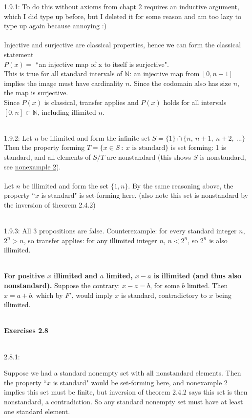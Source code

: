 \documentclass{article}
\newcommand{\hsp}[1][5]{\hspace{0.#1 cm}}
\newcommand{\hcm}[1][1]{\hspace{#1 cm}}
\newcommand{\st}{\ : \ }
\newcommand{\N}{\mathbb{N}}
\newcommand{\ch}[1]{\text{#1}}
\begin{document}
\begin{flushleft}
\hsp 1.9.1: To do this without axioms from chapt 2 requires an inductive argument, which I did type up before, but I deleted it for some reason and am too lazy to type up again because annoying :)\\\ \\\hcm Injective and surjective are classical properties, hence we can form the classical statement\\\hsp\hsp $P(x) = $ ``an injective map of x to itself is surjective".\\\hcm This is true for all standard intervals of $\N$: an injective map from $[0,n-1]$ implies the image must have cardinality $n$. Since the codomain also has size $n$, the map is surjective.\\\hcm Since $P(x)$ is classical, transfer applies and $P(x)$ holds for all intervals $[0,n]\subset \N$, including illimited $n$.\\\ 

\hsp 1.9.2: Let $n$ be illimited and form the infinite set $S = \{1\} \cap \{n,\ n+1,\ n+2,\ ...\}$ Then the property forming $T = \{x \in S \st x \ch{ is standard}\}$ is set forming: 1 is standard, and all elements of $S/T$ are nonstandard (this shows $S$ is nonstandard, see \hyperlink{non2}{nonexample 2}).\\\ \\\hcm
Let $n$ be illimited and form the set $\{1, n\}$. By the same reasoning above, the property ``$x$ is standard" is set-forming here. (also note this set is nonstandard by the inversion of theorem 2.4.2)\\\ 

\hsp 1.9.3: All 3 propositions are false. Counterexample: for every standard integer $n$, $2^n > n$, so transfer applies: for any illimited integer $n$, $n < 2^n$, so $2^n$ is also illimited.\\\

\hangindent=0cm
\textbf{For positive $x$ illimited and $a$ limited, $x-a$ is illimited (and thus also nonstandard).} Suppose the contrary: $x-a = b$, for some $b$ limited. Then $x = a + b$, which by $F'$, would imply $x$ is standard, contradictory to $x$ being illimited. \\\ 

\hangindent=1cm
\textbf{Exercises 2.8}\\\ 

\hsp \hypertarget{2.8.1}{2.8.1:} Suppose we had a standard nonempty set with all nonstandard elements. Then the property ``$x$ is standard" would be set-forming here, and \hyperlink{non2}{nonexample 2} implies this set must be finite, but inversion of theorem 2.4.2 says this set is then nonstandard, a contradiction. So any standard nonempty set must have at least one standard element.\\\ 


\end{flushleft}
\end{document}
